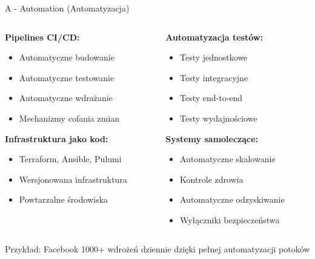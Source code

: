 \documentclass[10pt, aspectratio=169]{beamer}
\begin{document}
\begin{frame}{A - Automation (Automatyzacja)}
\begin{columns}[T]
\begin{column}{0.5\textwidth}
\textbf{Pipelines CI/CD:}
\begin{itemize}
\item Automatyczne budowanie
\item Automatyczne testowanie
\item Automatyczne wdrażanie
\item Mechanizmy cofania zmian
\end{itemize}

\textbf{Infrastruktura jako kod:}
\begin{itemize}
\item Terraform, Ansible, Pulumi
\item Wersjonowana infrastruktura
\item Powtarzalne środowiska
\end{itemize}
\end{column}
\begin{column}{0.5\textwidth}
\textbf{Automatyzacja testów:}
\begin{itemize}
\item Testy jednostkowe
\item Testy integracyjne
\item Testy end-to-end
\item Testy wydajnościowe
\end{itemize}

\textbf{Systemy samoleczące:}
\begin{itemize}
\item Automatyczne skalowanie
\item Kontrole zdrowia
\item Automatyczne odzyskiwanie
\item Wyłączniki bezpieczeństwa
\end{itemize}
\end{column}
\end{columns}

\begin{exampleblock}{Przykład: Facebook}
1000+ wdrożeń dziennie dzięki pełnej automatyzacji potoków
\end{exampleblock}
\end{frame}
\end{document}
